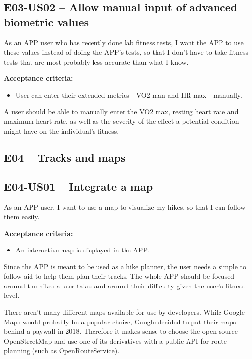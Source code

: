 \subsection*{E03-US02 -- Allow manual input of advanced biometric values}
As an APP user who has recently done lab fitness tests, I want the APP to use these values instead of doing the APP's tests, so that I don't have to take fitness tests that are most probably less accurate than what I know.

\textbf{Acceptance criteria:}
\begin{itemize}
    \item User can enter their extended metrics - VO2 man and HR max - manually.
\end{itemize}

A user should be able to manually enter the VO2 max, resting heart rate and maximum heart rate, as well as the severity of the effect a potential condition might have on the individual's fitness.

\subsection*{E04 -- Tracks and maps}

\subsection*{E04-US01 -- Integrate a map}
As an APP user, I want to use a map to visualize my hikes, so that I can follow them easily.

\textbf{Acceptance criteria:}
\begin{itemize}
    \item An interactive map is displayed in the APP.
\end{itemize}

Since the APP is meant to be used as a hike planner, the user needs a simple to follow aid to help them plan their tracks.
The whole APP should be focused around the hikes a user takes and around their difficulty given the user's fitness level.

There aren't many different maps available for use by developers.
While Google Maps would probably be a popular choice, Google decided to put their maps behind a paywall\cite{google-maps-paywall} in 2018.
Therefore it makes sense to choose the open-source OpenStreetMap\cite{OpenStreetMap} and use one of its derivatives with a public API for route planning (such as OpenRouteService\cite{OpenRouteService}).

